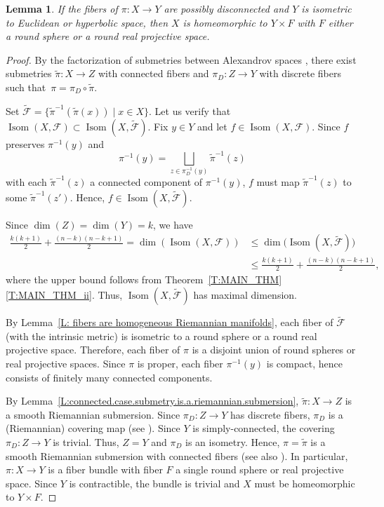 \documentclass[10pt,a4paper]{amsart}
\numberwithin{equation}{section}
\newtheorem{lem}[thm]{Lemma}
\theoremstyle{definition}
\DeclareMathOperator{\Iso}{Isom}
\newcommand{\fol}{\mathcal{F}}
\begin{document}
\begin{lem}
\label{L:disconnected.fibers.Y.is.Rk}
If the fibers of $\pi\colon X\to Y$ are possibly disconnected and $Y$ is isometric to Euclidean or hyperbolic space, then $X$ is homeomorphic to $Y\times F$ with $F$ either a round sphere or a round real projective space.
\end{lem}

\begin{proof}

By the factorization of submetries between Alexandrov spaces \cite[Theorem 10.1]{Lytchak}, there exist submetries
$\tilde{\pi}\colon X\to Z$ with connected fibers and $\pi_D\colon Z\to Y$ with discrete fibers such that~${\pi = \pi_D\circ\tilde{\pi}}$.

Set
$\tilde{\fol} =\big\{\tilde{\pi}^{-1}(\tilde{\pi}(x))\mid x\in X\big\}$.
Let us verify that $\Iso(X,\fol)\subset \Iso(X,\tilde{\fol})$.
Fix $y\in Y$ and let $f\in \Iso(X,\fol)$.
Since $f$ preserves $\pi^{-1}(y)$ and
\[
\pi^{-1}(y) = \bigsqcup_{z\in \pi^{-1}_D(y)}\tilde{\pi}^{-1}(z)
\]
with each $\tilde{\pi}^{-1}(z)$ a connected component of $\pi^{-1}(y)$, $f$ must map $\tilde{\pi}^{-1}(z)$ to some $\tilde{\pi}^{-1}(z')$.
Hence, $f\in\Iso(X,\tilde{\fol})$.

Since
$\dim(Z) = \dim(Y) = k$,
we have
\begin{align*}
\frac{k(k+1)}{2}+\frac{(n-k)(n-k+1)}{2}=\dim(\Iso(X,\fol))&\leq \dim\bigl(\Iso(X,\tilde{\fol})\bigr)\\
&\leq \frac{k(k+1)}{2}+\frac{(n-k)(n-k+1)}{2},
\end{align*}
where the upper bound follows from Theorem~\ref{T:MAIN_THM}\,\ref{T:MAIN_THM_ii}.
Thus, $\Iso(X,\tilde{\fol})$ has maximal dimension.

By Lemma~\ref{L: fibers are homogeneous Riemannian manifolds}, each fiber of $\tilde{\fol}$ (with the intrinsic metric) is isometric to a round sphere or a round real projective space. Therefore, each fiber of $\pi$ is a disjoint union of round spheres or real projective spaces.
Since $\pi$ is proper, each fiber $\pi^{-1}(y)$ is compact, hence consists of finitely many connected components.

By Lemma~\ref{L:connected.case.submetry.is.a.riemannian.submersion}, $\tilde{\pi}\colon X\to Z$ is a smooth Riemannian submersion.
Since $\pi_D\colon Z\to Y$ has discrete fibers, $\pi_D$ is a (Riemannian) covering map (see \cite[Theorem 1.2]{Lange2020}). Since $Y$ is simply-connected, the covering $\pi_D\colon Z\to Y$ is trivial. Thus, $Z = Y$ and $\pi_D$ is an isometry. Hence, $\pi = \tilde{\pi}$ is a smooth Riemannian submersion with connected fibers (see also \cite{LytchakWilking2024}). In particular, $\pi\colon X\to Y$ is a fiber bundle with fiber $F$ a single round sphere or real projective space.
Since $Y$ is contractible, the bundle is trivial and $X$ must be homeomorphic to $Y\times F$.
\end{proof}
\end{document}
